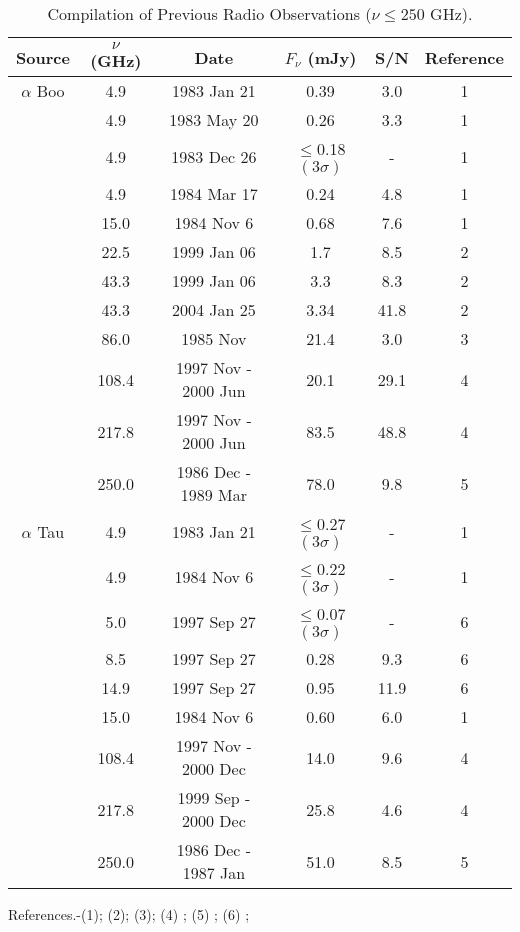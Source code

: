 \begin{table}[!hb]
\begin{center}
\caption[Compilation of Previous Radio Observations ($\nu \le 250$ GHz).]
{Compilation of Previous Radio Observations ($\nu \le 250$ GHz).}
\begin{tabular}{cccccc}
\hline
\hline
\rule{0pt}{2.5ex}Source & $\nu$ (GHz) & Date &  $F_{\nu}$ (mJy) & S/N & Reference\\
\hline
$\alpha$ Boo &4.9  & 1983 Jan 21 & 0.39 & 3.0 & 1 \\
&4.9  & 1983 May 20 & 0.26 & 3.3& 1 \\
&4.9  & 1983 Dec 26 & $\le$0.18$(3\sigma)$&- & 1 \\
&4.9  & 1984 Mar 17 & 0.24  & 4.8& 1 \\
&15.0 & 1984 Nov 6 & 0.68 & 7.6& 1 \\
&22.5  & 1999 Jan 06  &1.7& 8.5& 2 \\
&43.3  & 1999 Jan 06 & 3.3& 8.3& 2 \\
&43.3  & 2004 Jan 25 & 3.34& 41.8& 2 \\
&86.0  & 1985 Nov  & 21.4& 3.0& 3 \\
&108.4  & 1997 Nov - 2000 Jun & 20.1 &29.1 & 4 \\
&217.8 & 1997 Nov - 2000 Jun  & 83.5 &48.8 & 4 \\
&250.0  & 1986 Dec - 1989 Mar  & 78.0 & 9.8& 5 \\
\hline
\rule{0pt}{3ex}    $\alpha$ Tau	&4.9  & 1983 Jan 21 & $\le$0.27$(3\sigma)$&-& 1 \\
&4.9  & 1984 Nov 6 & $\le$0.22$(3\sigma)$&-& 1 \\
&5.0  & 1997 Sep 27 & $\le$0.07$(3\sigma)$	&-& 6 \\
&8.5  & 1997 Sep 27 & 0.28 	&9.3	& 6 \\
&14.9 & 1997 Sep 27 & 0.95 	&11.9	& 6 \\
&15.0 & 1984 Nov 6 & 0.60 	&6.0	& 1 \\
&108.4  & 1997 Nov - 2000 Dec &  14.0  & 9.6& 4 \\
&217.8 & 1999 Sep - 2000 Dec  & 25.8 & 4.6& 4 \\
&250.0  & 1986 Dec - 1987 Jan & 51.0 & 8.5& 5 \\
\hline
\end{tabular}
\label{tab:6.4.1}
\begin{minipage}{13.5cm}
\rule{0pt}{3ex} References.-(1)\cite{drake_1986}; (2)\cite{dehaes_2011}; (3)\cite{altenhoff_1986}; (4) \cite{cohen_2005}; (5) \cite{altenhoff_1994}; (6) \cite{wood_2007}; 
\end{minipage}
\end{center}
\end{table}

